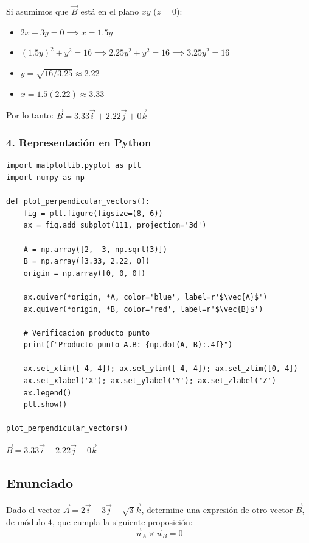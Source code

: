 \documentclass[12pt, a4paper]{article}
\begin{document}
Si asumimos que $\vec{B}$ está en el plano $xy$ ($z=0$):
\begin{itemize}
    \item $2x - 3y = 0 \implies x = 1.5y$
    \item $(1.5y)^2 + y^2 = 16 \implies 2.25y^2 + y^2 = 16 \implies 3.25y^2 = 16$
    \item $y = \sqrt{16/3.25} \approx 2.22$
    \item $x = 1.5(2.22) \approx 3.33$
\end{itemize}

Por lo tanto: $\vec{B} = 3.33\vec{i} + 2.22\vec{j} + 0\vec{k}$

\subsubsection*{4. Representación en Python}
\begin{lstlisting}
import matplotlib.pyplot as plt
import numpy as np

def plot_perpendicular_vectors():
    fig = plt.figure(figsize=(8, 6))
    ax = fig.add_subplot(111, projection='3d')
    
    A = np.array([2, -3, np.sqrt(3)])
    B = np.array([3.33, 2.22, 0])
    origin = np.array([0, 0, 0])
    
    ax.quiver(*origin, *A, color='blue', label=r'$\vec{A}$')
    ax.quiver(*origin, *B, color='red', label=r'$\vec{B}$')
    
    # Verificacion producto punto
    print(f"Producto punto A.B: {np.dot(A, B):.4f}")
    
    ax.set_xlim([-4, 4]); ax.set_ylim([-4, 4]); ax.set_zlim([0, 4])
    ax.set_xlabel('X'); ax.set_ylabel('Y'); ax.set_zlabel('Z')
    ax.legend()
    plt.show()

plot_perpendicular_vectors()
\end{lstlisting}

\begin{tcolorbox}[colback=green!5!white, colframe=green!50!black, title=Respuesta Final]
\centering \Large $\vec{B} = 3.33\vec{i} + 2.22\vec{j} + 0\vec{k}$
\end{tcolorbox}

\newpage

\subsection*{Enunciado}
Dado el vector $\vec{A} = 2\vec{i} - 3\vec{j} + \sqrt{3} \vec{k}$, determine una expresión de otro vector $\vec{B}$, de módulo $4$, que cumpla la siguiente proposición:
\begin{equation*}
    \vec{u}_A \times \vec{u}_B = 0
\end{equation*}
\end{document}
